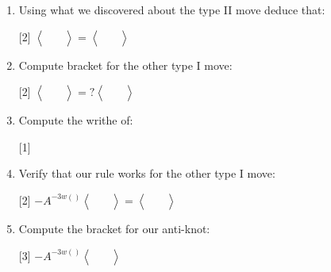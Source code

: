 \documentclass[14pt]{extarticle}
\newcommand{\LP}{\left(}
\newcommand{\RP}{\right)}
\newcommand{\LA}{\left\langle}
\newcommand{\RA}{\right\rangle}
\newcommand{\img}[1]{\begin{aligned}
    &\ \\
    &\\
    &\
\end{aligned}}
\newcommand{\bkt}[1]{\LA\img{#1}\RA}
\begin{document}
\pagestyle{fancy}
\fancyhf{}


\begin{enumerate}
\item{
Using what we discovered about the type II move deduce that:
\vspace{-2cm}
\begin{center}
\scalebox{2}[2]{
$\bkt{1.svg}=\bkt{6.svg}$
}
\end{center}
}
\vspace{5cm}

\item{
Compute bracket for the other type I move:
\vspace{-2cm}
\begin{center}
\scalebox{2}[2]{
    ${\LA\img{t1.svg}\RA=?\LA\img{t1_2.svg}\RA}$
    }
\end{center}
}
\newpage


\item{
Compute the writhe of:
\begin{center}
    \scalebox{1}[1]{
        $$
        }
\end{center}}

\vspace{5cm}
\item{
Verify that our rule works for the other type I move:
\vspace{-1cm}
\begin{center}
    \scalebox{2}[2]{
        $-A^{-3w\LP \RP}\LA\img{t1.svg}\RA=\LA\img{t1_2.svg}\RA$
        }
\end{center}}
\newpage
\item{
Compute the bracket for our anti-knot:
\vspace{-3cm}
\begin{center}
    \scalebox{3}[3]{
        $-A^{-3w\LP \RP}\LA\img{right.svg}\RA$
        }
\end{center}}
\end{enumerate}
\newpage
\end{document}
